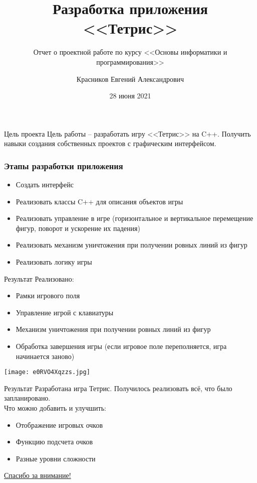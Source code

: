 \documentclass[9pt]{beamer}
\title{Разработка приложения <<Тетрис>>}
\subtitle{Отчет о проектной работе по курсу <<Основы информатики и программирования>>}
\author{Красников Евгений Александрович}
\date{28 июня 2021}
\begin{document}
\maketitle

\begin{frame}[fragile]{Цель проекта}
    Цель работы -- разработать игру <<Тетрис>> на C++. Получить навыки создания собственных проектов с графическим интерфейсом.
\end{frame}

\begin{frame}
    \frametitle{Этапы разработки приложения}
    \begin{itemize}
        \item Создать интерфейс
        \item Реализовать классы C++ для описания объектов игры
        \item Реализовать управление в игре (горизонтальное и вертикальное перемещение фигур, поворот и ускорение их падения)
        \item Реализовать механизм уничтожения при получении ровных линий из фигур
        \item Реализовать логику игры
    \end{itemize}
\end{frame}

\begin{frame}[fragile]{Результат}
    Реализовано:
    \begin{itemize}
        \item Рамки игрового поля
        \item Управление игрой с клавиатуры
        \item Механизм уничтожения при получении ровных линий из фигур
        \item Обработка завершения игры (если игровое поле переполняется, игра начинается заново)
    \end{itemize}

    \begin{center}
        \texttt{[image: e0RVO4Xqzzs.jpg]}
    \end{center}

\end{frame}

\begin{frame}[fragile]{Результат}
    Разработана игра Тетрис. Получилось реализовать всё, что было запланировано.\\
    Что можно добавить и улучшить:
    \begin{itemize}
        \item Отображение игровых очков
        \item Функцию подсчета очков
        \item Разные уровни сложности
    \end{itemize}
\end{frame}

\begin{frame}
    \begin{center}
        \Large
        \underline{Спасибо за внимание!}
    \end{center}
\end{frame}
\end{document}
